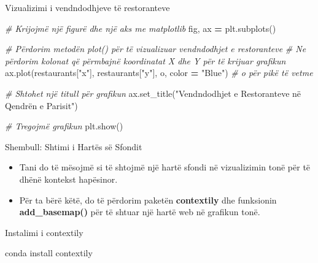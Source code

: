 \documentclass[
  ignorenonframetext,
]{beamer}
\newenvironment{Shaded}{\begin{snugshade}}{\end{snugshade}}
\newcommand{\CommentTok}[1]{\textcolor[rgb]{0.56,0.35,0.01}{\textit{#1}}}
\newcommand{\NormalTok}[1]{#1}
\newcommand{\OperatorTok}[1]{\textcolor[rgb]{0.81,0.36,0.00}{\textbf{#1}}}
\newcommand{\StringTok}[1]{\textcolor[rgb]{0.31,0.60,0.02}{#1}}
\begin{document}
\begin{frame}[fragile]{Vizualizimi i vendndodhjeve të restoranteve}
\protect\hypertarget{vizualizimi-i-vendndodhjeve-tuxeb-restoranteve}{}

\begin{Shaded}
\begin{Highlighting}[]
\CommentTok{\# Krijojmë një figurë dhe një aks me matplotlib}
\NormalTok{fig, ax }\OperatorTok{=}\NormalTok{ plt.subplots()}

\CommentTok{\# Përdorim metodën plot() për të vizualizuar vendndodhjet e restoranteve}
\CommentTok{\# Ne përdorim kolonat që përmbajnë koordinatat X dhe Y për të krijuar grafikun}
\NormalTok{ax.plot(restaurants[}\StringTok{"x"}\NormalTok{], restaurants[}\StringTok{"y"}\NormalTok{], }\StringTok{\textquotesingle{}o\textquotesingle{}}\NormalTok{, color }\OperatorTok{=} \StringTok{"Blue"}\NormalTok{)  }\CommentTok{\# \textquotesingle{}o\textquotesingle{} për pikë të vetme}

\CommentTok{\# Shtohet një titull për grafikun}
\NormalTok{ax.set\_title(}\StringTok{"Vendndodhjet e Restoranteve në Qendrën e Parisit"}\NormalTok{)}

\CommentTok{\# Tregojmë grafikun}
\NormalTok{plt.show()}
\end{Highlighting}
\end{Shaded}
\end{frame}

\begin{frame}{Shembull: Shtimi i Hartës së Sfondit}
\protect\hypertarget{shembull-shtimi-i-hartuxebs-suxeb-sfondit}{}
\begin{itemize}
\item
  Tani do të mësojmë si të shtojmë një hartë sfondi në vizualizimin tonë
  për të dhënë kontekst hapësinor.
\item
  Për ta bërë këtë, do të përdorim paketën \textbf{contextily} dhe
  funksionin \textbf{add\_basemap()} për të shtuar një hartë web në
  grafikun tonë.
\end{itemize}
\end{frame}

\begin{frame}[fragile]{Instalimi i contextily}
\protect\hypertarget{instalimi-i-contextily}{}

\begin{Shaded}
\begin{Highlighting}[]
\NormalTok{conda install contextily}
\end{Highlighting}
\end{Shaded}
\end{frame}
\end{document}
